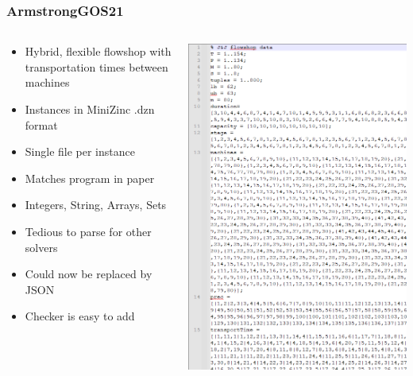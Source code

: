 \documentclass[dvipsnames,aspectratio=169]{beamer}
\begin{document}
\begin{frame}
\frametitle{ArmstrongGOS21~\cite{ArmstrongGOS21}}
\begin{columns}
\begin{column}{0.5\textwidth}
\begin{itemize}
\item Hybrid, flexible flowshop with transportation times between machines
\item Instances in MiniZinc .dzn format
\item Single file per instance
\item Matches program in paper
\item Integers, String, Arrays, Sets
\item Tedious to parse for other solvers
\item Could now be replaced by JSON
\item Checker is easy to add
\end{itemize}
\end{column}
\begin{column}{0.5\textwidth}
\includegraphics[width=.65\textwidth]{images/ArmstrongGOS21}
\end{column}
\end{columns}
\end{frame}
\end{document}
